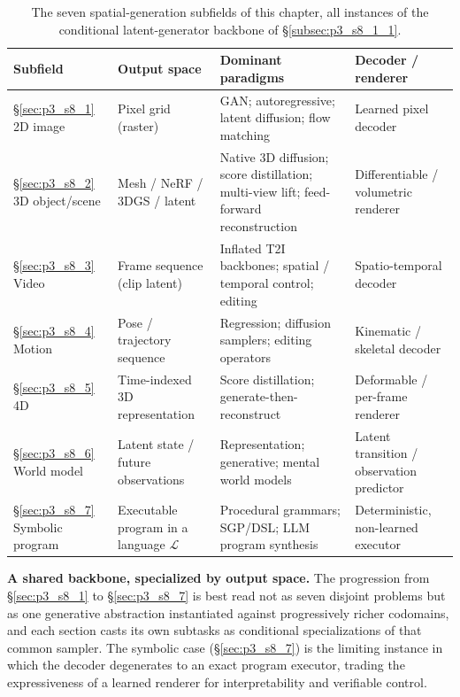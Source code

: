 \begin{table}[t]
\centering
\caption{The seven spatial-generation subfields of this chapter, all instances of the conditional latent-generator backbone of §\ref{subsec:p3_s8_1_1}.}
\label{tab:p3_s8_chapter_comparison}
\fontsize{8}{10}\selectfont
\setlength{\tabcolsep}{1.0mm}
\begin{tabular}{L{0.17\textwidth} L{0.20\textwidth} L{0.33\textwidth} L{0.22\textwidth}}
\toprule
\textbf{Subfield} & \textbf{Output space} & \textbf{Dominant paradigms} & \textbf{Decoder / renderer} \\
\midrule
§\ref{sec:p3_s8_1} 2D image & Pixel grid (raster) & GAN; autoregressive; latent diffusion; flow matching & Learned pixel decoder \\
§\ref{sec:p3_s8_2} 3D object/scene & Mesh / NeRF / 3DGS / latent & Native 3D diffusion; score distillation; multi-view lift; feed-forward reconstruction & Differentiable / volumetric renderer \\
§\ref{sec:p3_s8_3} Video & Frame sequence (clip latent) & Inflated T2I backbones; spatial / temporal control; editing & Spatio-temporal decoder \\
§\ref{sec:p3_s8_4} Motion & Pose / trajectory sequence & Regression; diffusion samplers; editing operators & Kinematic / skeletal decoder \\
§\ref{sec:p3_s8_5} 4D & Time-indexed 3D representation & Score distillation; generate-then-reconstruct & Deformable / per-frame renderer \\
§\ref{sec:p3_s8_6} World model & Latent state / future observations & Representation; generative; mental world models & Latent transition / observation predictor \\
§\ref{sec:p3_s8_7} Symbolic program & Executable program in a language $\mathcal{L}$ & Procedural grammars; SGP/DSL; LLM program synthesis & Deterministic, non-learned executor \\
\bottomrule
\end{tabular}
\end{table}

\textbf{A shared backbone, specialized by output space.} The progression from §\ref{sec:p3_s8_1} to §\ref{sec:p3_s8_7} is best read not as seven disjoint problems but as one generative abstraction instantiated against progressively richer codomains, and each section casts its own subtasks as conditional specializations of that common sampler. The symbolic case (§\ref{sec:p3_s8_7}) is the limiting instance in which the decoder degenerates to an exact program executor, trading the expressiveness of a learned renderer for interpretability and verifiable control.


